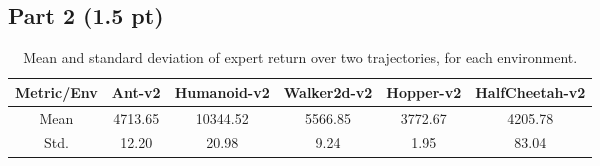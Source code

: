 \subsection{Part 2 (1.5 pt)}
\begin{table}[!h]
  \centering
  \caption{Mean and standard deviation of expert return over two trajectories, for each environment.}
  \begin{tabular}{cccccc}
    \toprule
    Metric/Env & Ant-v2 & Humanoid-v2 & Walker2d-v2 & Hopper-v2 & HalfCheetah-v2 \\
    \midrule
    Mean  & 4713.65 & 10344.52 & 5566.85 & 3772.67 & 4205.78 \\
    Std.  & 12.20 & 20.98 & 9.24 & 1.95 & 83.04 \\
    \bottomrule
  \end{tabular}
  \label{tab:p2}
\end{table}
